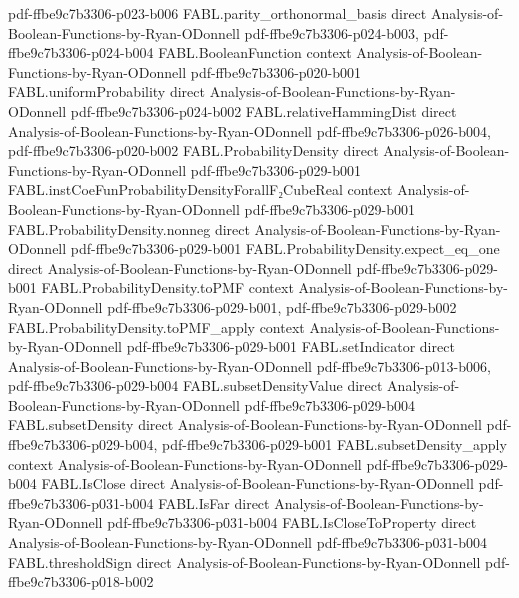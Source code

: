 \begin{theorem}
  {pdf-ffbe9c7b3306-p023-b006}
\proofstep
  {FABL.parity_orthonormal_basis}
  {direct}
  {Analysis-of-Boolean-Functions-by-Ryan-ODonnell}
  {pdf-ffbe9c7b3306-p024-b003,
    pdf-ffbe9c7b3306-p024-b004}
\proofstep
  {FABL.BooleanFunction}
  {context}
  {Analysis-of-Boolean-Functions-by-Ryan-ODonnell}
  {pdf-ffbe9c7b3306-p020-b001}
\proofstep
  {FABL.uniformProbability}
  {direct}
  {Analysis-of-Boolean-Functions-by-Ryan-ODonnell}
  {pdf-ffbe9c7b3306-p024-b002}
\proofstep
  {FABL.relativeHammingDist}
  {direct}
  {Analysis-of-Boolean-Functions-by-Ryan-ODonnell}
  {pdf-ffbe9c7b3306-p026-b004,
    pdf-ffbe9c7b3306-p020-b002}
\proofstep
  {FABL.ProbabilityDensity}
  {direct}
  {Analysis-of-Boolean-Functions-by-Ryan-ODonnell}
  {pdf-ffbe9c7b3306-p029-b001}
\proofstep
  {FABL.instCoeFunProbabilityDensityForallF₂CubeReal}
  {context}
  {Analysis-of-Boolean-Functions-by-Ryan-ODonnell}
  {pdf-ffbe9c7b3306-p029-b001}
\proofstep
  {FABL.ProbabilityDensity.nonneg}
  {direct}
  {Analysis-of-Boolean-Functions-by-Ryan-ODonnell}
  {pdf-ffbe9c7b3306-p029-b001}
\proofstep
  {FABL.ProbabilityDensity.expect_eq_one}
  {direct}
  {Analysis-of-Boolean-Functions-by-Ryan-ODonnell}
  {pdf-ffbe9c7b3306-p029-b001}
\proofstep
  {FABL.ProbabilityDensity.toPMF}
  {context}
  {Analysis-of-Boolean-Functions-by-Ryan-ODonnell}
  {pdf-ffbe9c7b3306-p029-b001,
    pdf-ffbe9c7b3306-p029-b002}
\proofstep
  {FABL.ProbabilityDensity.toPMF_apply}
  {context}
  {Analysis-of-Boolean-Functions-by-Ryan-ODonnell}
  {pdf-ffbe9c7b3306-p029-b001}
\proofstep
  {FABL.setIndicator}
  {direct}
  {Analysis-of-Boolean-Functions-by-Ryan-ODonnell}
  {pdf-ffbe9c7b3306-p013-b006,
    pdf-ffbe9c7b3306-p029-b004}
\proofstep
  {FABL.subsetDensityValue}
  {direct}
  {Analysis-of-Boolean-Functions-by-Ryan-ODonnell}
  {pdf-ffbe9c7b3306-p029-b004}
\proofstep
  {FABL.subsetDensity}
  {direct}
  {Analysis-of-Boolean-Functions-by-Ryan-ODonnell}
  {pdf-ffbe9c7b3306-p029-b004,
    pdf-ffbe9c7b3306-p029-b001}
\proofstep
  {FABL.subsetDensity_apply}
  {context}
  {Analysis-of-Boolean-Functions-by-Ryan-ODonnell}
  {pdf-ffbe9c7b3306-p029-b004}
\proofstep
  {FABL.IsClose}
  {direct}
  {Analysis-of-Boolean-Functions-by-Ryan-ODonnell}
  {pdf-ffbe9c7b3306-p031-b004}
\proofstep
  {FABL.IsFar}
  {direct}
  {Analysis-of-Boolean-Functions-by-Ryan-ODonnell}
  {pdf-ffbe9c7b3306-p031-b004}
\proofstep
  {FABL.IsCloseToProperty}
  {direct}
  {Analysis-of-Boolean-Functions-by-Ryan-ODonnell}
  {pdf-ffbe9c7b3306-p031-b004}
\proofstep
  {FABL.thresholdSign}
  {direct}
  {Analysis-of-Boolean-Functions-by-Ryan-ODonnell}
  {pdf-ffbe9c7b3306-p018-b002}

\end{theorem}
